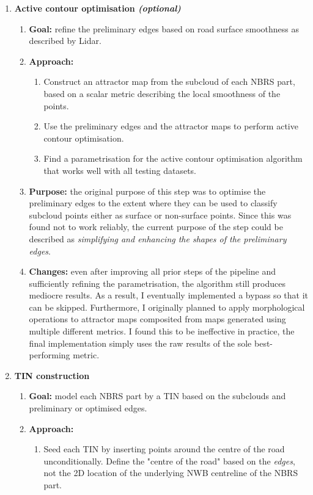 \begin{enumerate}
\begin{enumerate}
    \end{enumerate}
    \item \textbf{Active contour optimisation \textit{(optional)}}
    \begin{enumerate}
        \item \textbf{Goal:} refine the preliminary edges based on road surface smoothness as described by Lidar.
        \item \textbf{Approach:}
        \begin{enumerate}
            \item Construct an attractor map from the subcloud of each NBRS part, based on a scalar metric describing the local smoothness of the points.
            \item Use the preliminary edges and the attractor maps to perform active contour optimisation.
            \item Find a parametrisation for the active contour optimisation algorithm that works well with all testing datasets.
        \end{enumerate}
        \item \textbf{Purpose:} the original purpose of this step was to optimise the preliminary edges to the extent where they can be used to classify subcloud points either as surface or non-surface points. Since this was found not to work reliably, the current purpose of the step could be described as \textit{simplifying and enhancing the shapes of the preliminary edges}.
        \item \textbf{Changes:} even after improving all prior steps of the pipeline and sufficiently refining the parametrisation, the algorithm still produces mediocre results. As a result, I eventually implemented a bypass so that it can be skipped. Furthermore, I originally planned to apply morphological operations to attractor maps composited from maps generated using multiple different metrics. I found this to be ineffective in practice, the final implementation simply uses the raw results of the sole best-performing metric.
    \end{enumerate}
    \item \textbf{TIN construction}
    \begin{enumerate}
        \item \textbf{Goal:} model each NBRS part by a TIN based on the subclouds and preliminary or optimised edges.
        \item \textbf{Approach:}
        \begin{enumerate}
            \item Seed each TIN by inserting points around the centre of the road unconditionally. Define the "centre of the road" based on the \textit{edges}, not the 2D location of the underlying NWB centreline of the NBRS part.

\end{enumerate}
\end{enumerate}
\end{enumerate}
